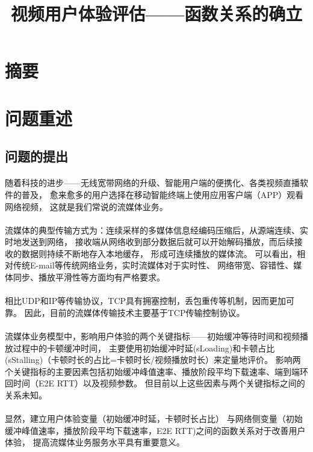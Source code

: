 \documentclass[UTF8]{ctexart}
\title{视频用户体验评估——函数关系的确立}
\begin{document}
\maketitle
\section{摘要}
\section{问题重述}
\subsection{问题的提出}
\paragraph{}
随着科技的进步——无线宽带网络的升级、智能用户端的便携化、各类视频直播软件的普及，
愈来愈多的用户选择在移动智能终端上使用应用客户端（APP）观看网络视频，
这就是我们常说的流媒体业务。
\paragraph{}
流媒体的典型传输方式为：连续采样的多媒体信息经编码压缩后，从源端连续、实时地发送到网络， 
接收端从网络收到部分数据后就可以开始解码播放，而后续接 收的数据则持续不断地存入本地缓存，
形成可连续播放的媒体流。\cite{}
可以看出，相对传统E-mail等传统网络业务，实时流媒体对于实时性、 网络带宽、容错性、媒体同步、播放平滑性等方面均有严格要求。
\paragraph{}
相比UDP和IP等传输协议，TCP具有拥塞控制，丢包重传等机制，因而更加可靠。
因此，目前的流媒体传输技术主要基于TCP传输控制协议。
\paragraph{}
流媒体业务模型中，影响用户体验的两个关键指标——初始缓冲等待时间和视频播放过程中的卡顿缓冲时间，
主要使用初始缓冲时延(sLoading)和卡顿占比(sStalling)（卡顿时长的占比=卡顿时长/视频播放时长）来定量地评价。
影响两个关键指标的主要因素包括初始缓冲峰值速率、播放阶段平均下载速率、端到端环回时间（E2E RTT）以及视频参数。
但目前以上这些因素与两个关键指标之间的关系未知。\cite{}
\paragraph{}
显然，建立用户体验变量（初始缓冲时延，卡顿时长占比）
与网络侧变量（初始缓冲峰值速率，播放阶段平均下载速率，E2E RTT)之间的函数关系对于改善用户体验，
提高流媒体业务服务水平具有重要意义。
\end{document}
